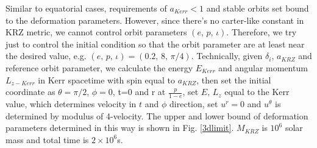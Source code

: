 \documentclass{article}
\begin{document}
Similar to equatorial cases, requirements of $a_{Kerr}<1$ and stable orbits set bound to the deformation parameters. However, since there's no carter-like constant in KRZ metric, we cannot control orbit parameters $(e,\, p,\, \iota)$. Therefore, we try just to control the initial condition so that the orbit parameter are at least near the desired value, e.g. $(e,\, p,\, \iota) = (0.2,\, 8,\, \pi/4 )$. Technically, given $\delta_i$, $a_{KRZ}$ and reference orbit parameter, we calculate the energy $E_{Kerr}$ and angular momentum $L_{z -Kerr}$ in Kerr spacetime with spin equal to $a_{KRZ}$, then set the initial coordinate as $\theta=\pi/2$, $\phi=0$, t=0 and r at $\frac{p}{1-e}$, set $E,\, L_z$ equal to the Kerr value, which determines velocity in $t$ and $\phi$ direction, set $u^r=0$ and $u^\theta$ is determined by modulus of 4-velocity. The upper and lower bound of deformation parameters determined in this way is shown in Fig. \ref{3dlimit}. $M_{KRZ}$ is $10^6$ solar mass and total time is $2\times 10^6$s.







\end{document}
